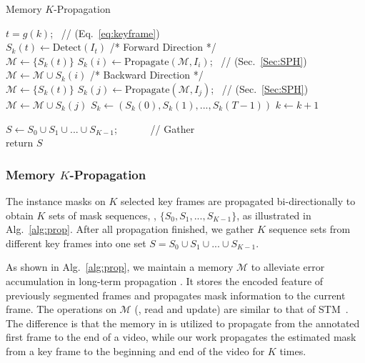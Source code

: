 \documentclass[10pt,twocolumn,letterpaper]{article}
\begin{document}
	\begin{algorithm}[t]\label{alg:prop} 
		\caption{Memory $K$-Propagation} 
		{
			
			$t = g(k)$; ~\textcolor[rgb]{0.5,0.5,0.5}{\footnotesize // (Eq.~\ref{eq:keyframe})} \\  
$S_k(t) \leftarrow \text{Detect}(I_t)$\;
			\textcolor[rgb]{0.5,0.5,0.5}{\footnotesize /* Forward Direction */} \\
			$\mathcal{M} \leftarrow \{S_k(t)\}$\;    
			{
				$S_k(i) \leftarrow \text{Propagate}(\mathcal{M}, I_i)$; ~\textcolor[rgb]{0.5,0.5,0.5}{\footnotesize // (Sec.~\ref{Sec:SPH}) } \\
				$\mathcal{M} \leftarrow \mathcal{M} \cup S_k(i)$\;
			}
			\textcolor[rgb]{0.5,0.5,0.5}{\footnotesize /* Backward Direction */} \\
			$\mathcal{M} \leftarrow \{S_k(t)\}$\;    
			{
				$S_k(j) \leftarrow \text{Propagate}(\mathcal{M}, I_j)$; ~\textcolor[rgb]{0.5,0.5,0.5}{\footnotesize // (Sec.~\ref{Sec:SPH})} \\
				$\mathcal{M} \leftarrow \mathcal{M} \cup S_k(j)$\;
			}
			$S_k \leftarrow (S_k(0), S_k(1), ..., S_k(T-1))$\;
			$k \leftarrow k + 1$\; 
}
		$S \leftarrow S_0 \cup S_1 \cup ... \cup S_{K-1}$; ~~~~~~\textcolor[rgb]{0.5,0.5,0.5}{\footnotesize // Gather }  \\
		return $S$\;	
		
	\end{algorithm}
	
	\subsubsection{Memory $K$-Propagation}\label{Sec:MKP}
	The instance masks on $K$ selected key frames are propagated bi-directionally to obtain $K$ sets of mask sequences, \ie, $\{S_0, S_1, ..., S_{K-1}\}$, as illustrated in Alg.~\ref{alg:prop}.  After all propagation finished, we gather $K$ sequence sets from different key frames into one set $S = S_0 \cup S_1 \cup ... \cup S_{K-1}$.
	
	As shown in Alg.~\ref{alg:prop}, we maintain a memory $\mathcal{M}$ to alleviate error accumulation in long-term propagation \cite{oh2019video}. It stores the encoded feature of previously segmented frames and propagates mask information to the current frame.
	The operations on $\mathcal{M}$ (\eg, read and update) are similar to that of STM~\cite{oh2019video}. The difference is that the memory in \cite{oh2019video} is utilized to propagate from the annotated first frame to the end of a video, while our work propagates the estimated mask from a key frame to the beginning and end of the video for $K$ times. 
	
\end{document}
